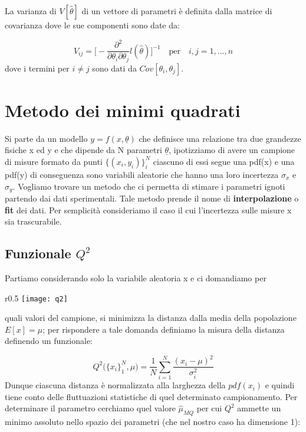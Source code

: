 La varianza di $V[\hat{\theta}]$ di un vettore di parametri \`{e} definita dalla matrice di covarianza dove le sue componenti sono date da:

\begin{equation}
	V_{ij} = \Big[ - \dfrac{\partial^2}{\partial \theta_i \partial \theta_j}l(\hat{\theta}) \Big]^{-1} \quad \text{per} \quad i,j = 1,...,n
\end{equation}
dove i termini per $i \neq j$ sono dati da $Cov[\theta_i,\theta_j]$.


\section{Metodo dei minimi quadrati}
Si parte da un modello $y = f(x,\underline{\theta})$ che definisce una relazione tra due grandezze fisiche x ed y e che dipende da N parametri $\underline{\theta}$, ipotizziamo di avere un campione di misure formato da punti $\{(x_i,y_i)\}_{i}^N$ ciascuno di essi segue una pdf(x) e una pdf(y) di conseguenza sono variabili aleatorie che hanno una loro incertezza $\sigma_x$ e $\sigma_y$. Vogliamo trovare un metodo che ci permetta di stimare i parametri ignoti partendo dai dati sperimentali. Tale metodo prende il nome di \textbf{interpolazione} o \textbf{fit} dei dati. Per semplicit\`{a} consideriamo il caso il cui l'incertezza sulle misure x sia trascurabile.

\subsection{Funzionale $Q^2$}

\noindent Partiamo considerando solo la variabile aleatoria x  e ci domandiamo per 
\begin{wrapfigure}{r}{0.5 \textwidth}
\vspace{-10pt}
\centering
\texttt{[image: q2]}	
\end{wrapfigure}
quali valori del campione, si minimizza la distanza dalla media della popolazione $E[x] = \mu$; per rispondere a tale domanda definiamo la misura della distanza definendo un funzionale:
\newline

\begin{equation}
	Q^2\Big(\{x_i\}_1^N,\mu \Big) = \dfrac{1}{N}\sum_{i=1}^N\dfrac{(x_i - \mu)^2}{\sigma_i^2}
\end{equation}
\newline
Dunque ciascuna distanza \`{e} normalizzata alla larghezza della $pdf(x_i)$ e quindi tiene conto delle fluttuazioni statistiche di quel determinato campionamento.\newline
 Per determinare il  parametro cerchiamo quel valore $\hat{\mu}_{MQ}$ per cui $Q^2$ ammette un minimo assoluto nello spazio dei parametri (che nel nostro caso ha dimensione 1):

